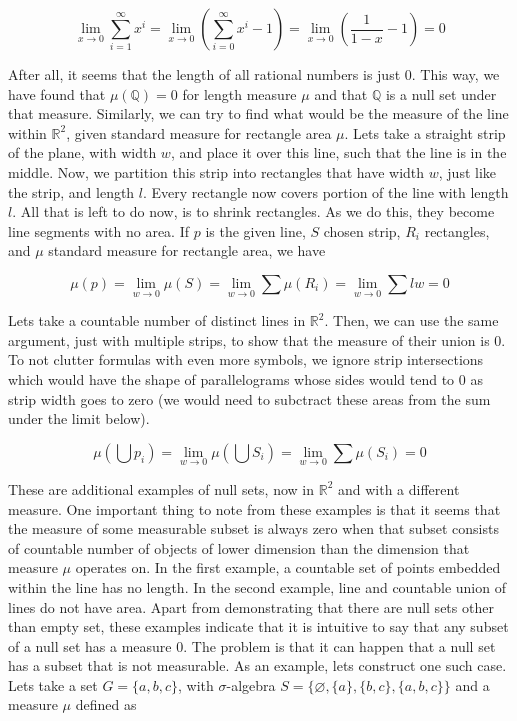 \documentclass{article}
\begin{document}
\[ \lim_{x \to 0}\sum_{i=1}^{\infty}x^i=\lim_{x \to 0}(\sum_{i=0}^{\infty}x^i-1)=\lim_{x \to 0} (\frac{1}{1-x} - 1)=0 \]

After all, it seems that the length of all rational numbers is just 0. This way, we have found that $\mu(\mathbb{Q})=0$ for length measure $\mu$ and that $\mathbb{Q}$ is a null set under that measure.
\newline\indent Similarly, we can try to find what would be the measure of the line within $\mathbb{R}^2$, given standard measure for rectangle area $\mu$. Lets take a straight strip of the plane, with width $w$, and place it over this line, such that the line is in the middle. Now, we partition this strip into rectangles that have width $w$, just like the strip, and length $l$. Every rectangle now covers portion of the line with length $l$. All that is left to do now, is to shrink rectangles. As we do this, they become line segments with no area. If $p$ is the given line, $S$ chosen strip, $R_i$ rectangles, and $\mu$ standard measure for rectangle area, we have

\[\mu(p)=\lim_{w \to 0}\mu(S)=\lim_{w \to 0}\sum\mu(R_i)=\lim_{w \to 0}\sum lw=0\]

Lets take a countable number of distinct lines in $\mathbb{R}^2$. Then, we can use the same argument, just with multiple strips, to show that the measure of their union is 0. To not clutter formulas with even more symbols, we ignore strip intersections which would have the shape of parallelograms whose sides would tend to 0 as strip width goes to zero (we would need to subctract these areas from the sum under the limit below).

\[ \mu(\bigcup p_i) = \lim_{w \to 0}\mu(\bigcup S_i) = \lim_{w \to 0}\sum\mu(S_i) = 0 \]

These are additional examples of null sets, now in $\mathbb{R}^2$ and with a different measure. One important thing to note from these examples is that it seems that the measure of some measurable subset is always zero when that subset consists of countable number of objects of lower dimension than the dimension that measure $\mu$ operates on. In the first example, a countable set of points embedded within the line has no length. In the second example, line and countable union of lines do not have area. 
\newline\indent Apart from demonstrating that there are null sets other than empty set, these examples indicate that it is intuitive to say that any subset of a null set has a measure 0. The problem is that it can happen that a null set has a subset that is not measurable. As an example, lets construct one such case. Lets take a set $G=\{a,b,c\}$, with $\sigma$-algebra $S=\{\varnothing, \{a\},\{b,c\},\{a,b,c\}\}$ and a measure $\mu$ defined as
\end{document}
